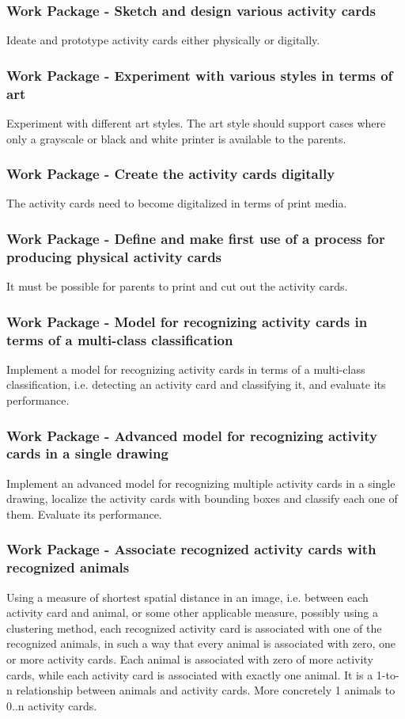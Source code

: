 \subsubsection{Work Package - Sketch and design various activity cards}
Ideate and prototype activity cards either physically or digitally.

\subsubsection{Work Package - Experiment with various styles in terms of art}
Experiment with different art styles.
The art style should support cases where only a grayscale or black and white printer is available to the parents.

\subsubsection{Work Package - Create the activity cards digitally}
The activity cards need to become digitalized in terms of print media.

\subsubsection{Work Package - Define and make first use of a process for producing physical activity cards}
It must be possible for parents to print and cut out the activity cards.

\subsubsection{Work Package - Model for recognizing activity cards in terms of a multi-class classification}
Implement a model for recognizing activity cards in terms of a multi-class classification, i.e. detecting an activity card and classifying it, and evaluate its performance.

\subsubsection{Work Package - Advanced model for recognizing activity cards in a single drawing}
Implement an advanced model for recognizing multiple activity cards in a single drawing, localize the activity cards with bounding boxes and classify each one of them.
Evaluate its performance.

\subsubsection{Work Package - Associate recognized activity cards with recognized animals}
Using a measure of shortest spatial distance in an image, i.e. between each activity card and animal, or some other applicable measure, possibly using a clustering method, each recognized activity card is associated with one of the recognized animals, in such a way that every animal is associated with zero, one or more activity cards.
Each animal is associated with zero of more activity cards, while each activity card is associated with exactly one animal.
It is a 1-to-n relationship between animals and activity cards.
More concretely 1 animals to 0..n activity cards.



